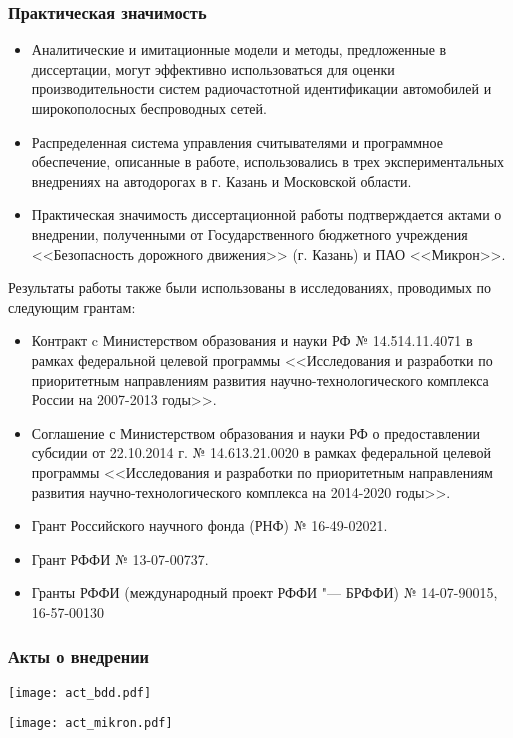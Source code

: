 \begin{frame}[allowframebreaks]
    \frametitle{Практическая значимость}
    \small
    \begin{itemize}
        \item Аналитические и имитационные модели и методы, предложенные в диссертации, могут эффективно использоваться для оценки производительности систем радиочастотной идентификации автомобилей и широкополосных беспроводных сетей.
        \item Распределенная система управления считывателями и программное обеспечение, описанные в работе, использовались в трех экспериментальных внедрениях на автодорогах в г. Казань и Московской области.
        \item Практическая значимость диссертационной работы подтверждается актами о внедрении, полученными от Государственного бюджетного учреждения <<Безопасность дорожного движения>> (г. Казань) и ПАО <<Микрон>>.
    \end{itemize}
    \framebreak
    Результаты работы также были использованы в исследованиях, проводимых по следующим грантам:
    \footnotesize
    \begin{itemize}
        \item Контракт c Министерством образования и науки РФ № 14.514.11.4071 в рамках федеральной целевой программы <<Исследования и разработки по приоритетным направлениям развития научно-технологического комплекса России на 2007-2013 годы>>.
        \item Соглашение с Министерством образования и науки РФ о предоставлении субсидии от 22.10.2014 г. № 14.613.21.0020 в рамках федеральной целевой программы <<Исследования и разработки по приоритетным направлениям развития научно-технологического комплекса на 2014-2020 годы>>.
        \item Грант Российского научного фонда (РНФ) № 16-49-02021.
        \item Грант РФФИ № 13-07-00737.
        \item Гранты РФФИ (международный проект РФФИ "--- БРФФИ) № 14-07-90015, 16-57-00130
    \end{itemize}
\end{frame}

\begin{frame}
    \frametitle{Акты о внедрении}
    \begin{minipage}[t]{0.49\linewidth}
        \texttt{[image: act\_bdd.pdf]}
    \end{minipage}
    \hfill
    \begin{minipage}[t]{0.49\linewidth}
        \texttt{[image: act\_mikron.pdf]}
    \end{minipage}
\end{frame}

